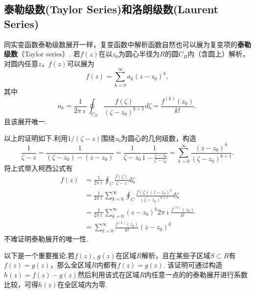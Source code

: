 \subsection{泰勒级数(Taylor Series)和洛朗级数(Laurent Series)}
\label{subsec:taylor_laurent_series}
同实变函数泰勒级数展开一样，复变函数中解析函数自然也可以展为复变项的\textbf{泰勒级数}（Taylor series）.
若$f(z)$在以$z_0$为圆心半径为$R$的圆$C_R$内（含圆上）解析，对圆内任意$z$，$f(z)$可以展为
\begin{equation}
    f(z) = \sum_{k=0}^{\infty} a_k (z-z_0)^k,
\end{equation}
其中
\begin{equation}
    a_k=\frac{1}{2 \pi \imath} \oint_{C_{R}} \frac{f(\zeta)}{\left(\zeta-z_0\right)^{k+1}} d \zeta
    =\frac{f^{(k)}\left(z_0\right)}{k !} ,
\end{equation}
且该展开唯一.

以上的证明如下.利用$1/(\zeta -z)$围绕$z_0$为圆心的几何级数，构造
\[
\frac{1}{\zeta -z} = \frac{1}{(\zeta -z_0) - (z - z_0)} = \frac{1}{\zeta - z_0}\frac{1}{ 1 - \frac{z-z_0}{\zeta - z_0}}
 = \sum_{k=0}^{\infty}\frac{(z-z_0)^k}{(\zeta - z_0)^{k+1}}.    
\]
将上式带入柯西公式有
\begin{equation}
    \begin{aligned}
        f(z) &= \frac{1}{2\pi \imath} \oint_C \frac{f(\zeta)}{\zeta - z} d \zeta
        \\
        &= \frac{1}{2\pi \imath} \sum_{k=0} ^{\infty} \oint_C \frac{f(\zeta)(z-z_0)^k}{(\zeta - z_0)^{k+1}} d \zeta
        \\
        &= \frac{1}{2\pi \imath} \sum_{k=0} ^{\infty}(z-z_0)^k 2\pi \imath \frac{f^{(k)}(z_0)}{k!}
        \\
        & = \sum_{k=0} ^{\infty}  \frac{f^{(k)}(z_0)}{k!} (z-z_0)^k
    \end{aligned}
\end{equation}
不难证明泰勒展开的唯一性.

以下是一个重要推论.若$f(z)$, $g(z)$在区域$R$解析，且在某些子区域$S\subset R$有$f(z)=g(z)$，那么全区域$R$内都有$f(z)=g(z)$.
该证明可通过构造$h(z) = f(z) - g(z)$然后利用该式在区域$R$内任意一点的的泰勒展开进行系数比较，可得$h(z)$在全区域内为零.

